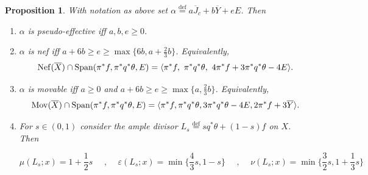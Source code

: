 \documentclass[12pt]{amsart}
\newtheorem{proposition}[lemma]{Proposition}
\theoremstyle{definition}
\renewcommand{\geq}{\geqslant}
\renewcommand{\leq}{\leqslant}
\DeclareMathOperator{\Nef}{Nef}
\DeclareMathOperator{\Mov}{Mov}
\newcommand{\deq}{\ensuremath{\stackrel{\textrm{def}}{=}}}
\newcommand{\?}{ \circled{{\large\bf ?}}}
\begin{document}
\begin{proposition}\label{prop:firstCxJ}With notation as above set $\alpha\deq a\overline J_c+b\overline Y+eE$. Then
	\begin{enumerate}
		\item $\alpha$ is pseudo-effective iff $a,b,e\geq 0$.
		\smallskip
		
		\item $\alpha$ is nef iff $a+6b\geq e\geq\max\{6b,a+\frac 23b\}$. Equivalently, \[\Nef(\overline X)\cap {\rm Span}(\pi^* f,\pi^*q^*\theta,E)=\langle\pi^*f,\ \pi^*q^*\theta,\ 4\pi^*f+3\pi^*q^*\theta-4E\rangle.\]
		\smallskip
		
		\item 
		$\alpha$ is movable iff $a\geq 0$ and $a+6b\geq e\geq\max\{a,\frac 23b\}$. Equivalently, \[\Mov(\overline X)\cap{\rm Span}(\pi^*f,\pi^*q^*\theta,E)=\langle \pi^*f,\pi^*q^*\theta,3\pi^*q^*\theta-4E,2\pi^*f+3\overline Y\rangle.\]
		\smallskip
		
		\item For $s\in(0,1)$ consider the ample divisor $L_s\deq sq^*\theta+(1-s)f$ on $X$. Then
		
		\[\mu(L_s;x)=1+\frac 12s\quad\text{ , }\quad\varepsilon(L_s;x)=\min\{\frac 43s,1-s\}\quad\text{ , }\quad \nu(L_s;x)=\min\{\frac 32s,1+\frac 13s\}\] 
				\smallskip
				

\end{enumerate}
\end{proposition}
\end{document}
